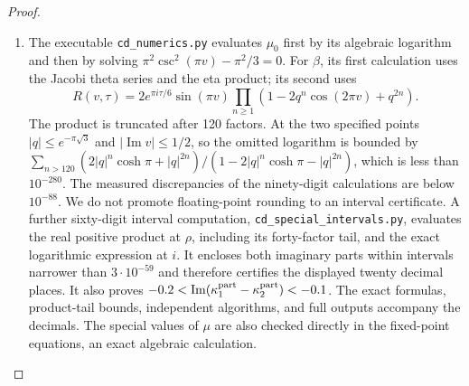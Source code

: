 \begin{proof}
\begin{enumerate}[label=\arabic*.,leftmargin=*]
\item The executable \texttt{cd\_numerics.py} evaluates \(\mu_0\) first by its
algebraic logarithm and then by solving
\(\pi^2\csc^2(\pi v)-\pi^2/3=0\). For \(\beta\), its first calculation uses
the Jacobi theta series and the eta product; its second uses
\[
 R(v,\tau)=2e^{\pi i\tau/6}\sin(\pi v)
 \prod_{n\geq1}(1-2q^n\cos(2\pi v)+q^{2n}).
\]
The product is truncated after 120 factors. At the two specified points
\(|q|\leq e^{-\pi\sqrt3}\) and \(|\operatorname{Im}v|\leq1/2\), so the
omitted logarithm is bounded by
\(\sum_{n>120}(2|q|^n\cosh\pi+|q|^{2n})/(1-2|q|^n\cosh\pi-|q|^{2n})\),
which is less than \(10^{-280}\). The measured discrepancies of the
ninety-digit calculations are below \(10^{-88}\). We do not promote floating-point rounding to an interval certificate.
A further sixty-digit interval computation, \texttt{cd\_special\_intervals.py},
evaluates the real positive product at $\rho$, including its forty-factor
tail, and the exact logarithmic expression at $i$. It encloses both
imaginary parts within intervals narrower than $3\cdot10^{-59}$ and
therefore certifies the displayed twenty decimal places. It also proves
$-0.2<\operatorname{Im}(\kappa_1^{\rm part}-\kappa_2^{\rm part})<-0.1$.
The exact formulas, product-tail bounds, independent algorithms, and
full outputs accompany the decimals. The special values of \(\mu\) are also checked directly in
the fixed-point equations, an exact algebraic calculation.
\end{enumerate}
\end{proof}

